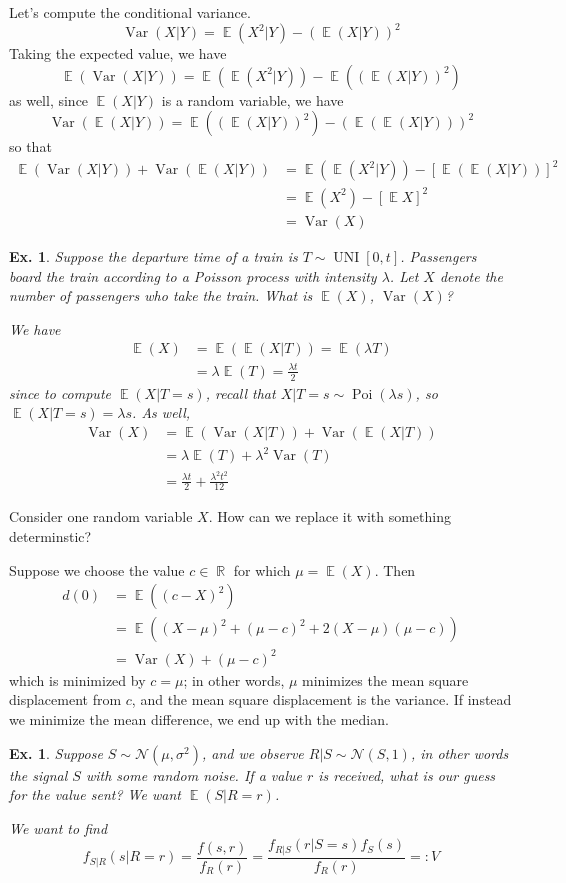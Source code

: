 \documentclass[12pt, a4paper]{book}
\DeclareMathOperator{\R}{\mathbb{R}}
\DeclareMathOperator{\E}{\mathbb{E}}
\DeclareMathOperator{\Var}{Var}
\DeclareMathOperator{\Poi}{Poi}
\DeclareMathOperator{\UNI}{UNI}
\newtheorem{example}[theorem]{Ex.}
\theoremstyle{nonumberplain}
\begin{document}
Let's compute the conditional variance.
\[\Var(X|Y)=\E(X^2|Y)-(\E(X|Y))^2\]
Taking the expected value, we have
\[\E(\Var(X|Y))=\E(\E(X^2|Y))-\E((\E(X|Y))^2)\]
as well, since $\E(X|Y)$ is a random variable, we have
\[\Var(\E(X|Y))=\E((\E(X|Y))^2)-(\E(\E(X|Y)))^2\]
so that
\begin{align*}
    \E(\Var(X|Y))+\Var(\E(X|Y)) &= \E(\E(X^2|Y))-[\E(\E(X|Y))]^2\\
                                &= \E(X^2)-[\E X]^2\\
                                &= \Var(X)
\end{align*}
\begin{example}
    Suppose the departure time of a train is $T\sim\UNI[0,t]$.
    Passengers board the train according to a Poisson process with intensity $\lambda$.
    Let $X$ denote the number of passengers who take the train.
    What is $\E(X)$, $\Var(X)$?

    We have
    \begin{align*}
        \E(X) &= \E(\E(X|T))=\E(\lambda T)\\
              &= \lambda \E(T)=\frac{\lambda t}{2}
    \end{align*}
    since to compute $\E(X|T=s)$, recall that $X|T=s\sim\Poi(\lambda s)$, so $\E(X|T=s)=\lambda s$.
    As well,
    \begin{align*}
        \Var(X) &= \E(\Var(X|T))+\Var(\E(X|T))\\
                &= \lambda\E(T)+\lambda^2\Var(T)\\
                &= \frac{\lambda t}{2}+\frac{\lambda^2 t^2}{12}
    \end{align*}
\end{example}
Consider one random variable $X$.
How can we replace it with something determinstic?

Suppose we choose the value $c\in\R$ for which $\mu=\E(X)$.
Then
\begin{align*}
    d(0) &= \E((c-X)^2)\\
         &= \E((X-\mu)^2+(\mu-c)^2+2(X-\mu)(\mu-c))\\
         &= \Var(X) + (\mu-c)^2
\end{align*}
which is minimized by $c=\mu$; in other words, $\mu$ minimizes the mean square displacement from $c$, and the mean square displacement is the variance.
If instead we minimize the mean difference, we end up with the median.
\begin{example}
    Suppose $S\sim\mathcal{N}(\mu,\sigma^2)$, and we observe $R|S\sim\mathcal{N}(S,1)$, in other words the signal $S$ with some random noise.
    If a value $r$ is received, what is our guess for the value sent?
    We want $\E(S|R=r)$.

    We want to find
    \[f_{S|R}(s|R=r)=\frac{f(s,r)}{f_R(r)}=\frac{f_{R|S}(r|S=s)f_S(s)}{f_R(r)}=: V\]
\end{example}
\end{document}
